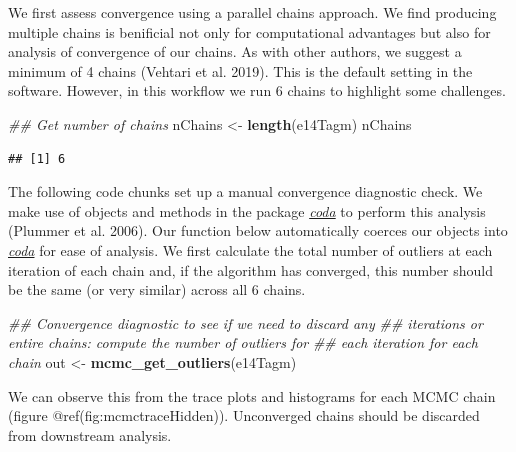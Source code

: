 \documentclass[
]{article}
\newenvironment{Shaded}{\begin{snugshade}}{\end{snugshade}}
\newcommand{\CommentTok}[1]{\textcolor[rgb]{0.56,0.35,0.01}{\textit{#1}}}
\newcommand{\KeywordTok}[1]{\textcolor[rgb]{0.13,0.29,0.53}{\textbf{#1}}}
\newcommand{\NormalTok}[1]{#1}
\newcommand{\StringTok}[1]{\textcolor[rgb]{0.31,0.60,0.02}{#1}}
\begin{document}
We first assess convergence using a parallel chains approach. We find
producing multiple chains is benificial not only for computational
advantages but also for analysis of convergence of our chains. As with
other authors, we suggest a minimum of 4 chains (Vehtari et al. 2019).
This is the default setting in the software. However, in this workflow
we run \(6\) chains to highlight some challenges.

\begin{Shaded}
\begin{Highlighting}[]
\CommentTok{## Get number of chains}
\NormalTok{nChains <-}\StringTok{ }\KeywordTok{length}\NormalTok{(e14Tagm)}
\NormalTok{nChains}
\end{Highlighting}
\end{Shaded}

\begin{verbatim}
## [1] 6
\end{verbatim}

The following code chunks set up a manual convergence diagnostic check.
We make use of objects and methods in the package
\emph{\href{https://CRAN.R-project.org/package=coda}{coda}} to perform
this analysis (Plummer et al. 2006). Our function below automatically
coerces our objects into
\emph{\href{https://CRAN.R-project.org/package=coda}{coda}} for ease of
analysis. We first calculate the total number of outliers at each
iteration of each chain and, if the algorithm has converged, this number
should be the same (or very similar) across all 6 chains.

\begin{Shaded}
\begin{Highlighting}[]
\CommentTok{## Convergence diagnostic to see if we need to discard any}
\CommentTok{## iterations or entire chains: compute the number of outliers for}
\CommentTok{## each iteration for each chain}
\NormalTok{out <-}\StringTok{ }\KeywordTok{mcmc_get_outliers}\NormalTok{(e14Tagm)}
\end{Highlighting}
\end{Shaded}

We can observe this from the trace plots and histograms for each MCMC
chain (figure @ref(fig:mcmctraceHidden)). Unconverged chains should be
discarded from downstream analysis.
\end{document}
